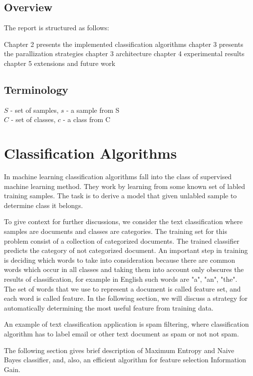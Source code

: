 \documentclass{report}
\begin{document}
\section{Overview}

The report is structured as follows: 

Chapter 2 presents the implemented classification algorithms
chapter 3 presents the parallization strategies
chapter 3 architecture
chapter 4 experimental results
chapter 5 extensions and future work

\section{Terminology}

$S$ - set of samples, $s$ - a sample from S \\
$C$ - set of classes, $c$ - a class from C

\chapter{Classification Algorithms}

In machine learning classification algorithms fall into the class of supervised machine learning method. They work by learning from some known set of labled training samples. The task is to derive a model that  given unlabled sample to determine class it belongs.

To give context for further discussions, we consider the text classification  where samples are documents and classes are categories. The training set for this problem consist of a collection of categorized documents. The trained classifier predicts the category of not categorized document. An important step in training is deciding which words to take into consideration because there are common words which occur in all classes and taking them into account only obscures the results of classification, for example in English such words are "a", "an", "the". The set of words that we use to represent a document is called feature set, and each word is called feature. In the following section, we will discuss a strategy for automatically determining the most useful feature from training data.

An example of text classification application is spam filtering, where classification algorithm has to label email or other text document as spam or not not spam. 

The following section gives brief description of Maximum Entropy and Naive Bayes classifier, and, also, an efficient algorithm for feature selection Information Gain.
\end{document}
